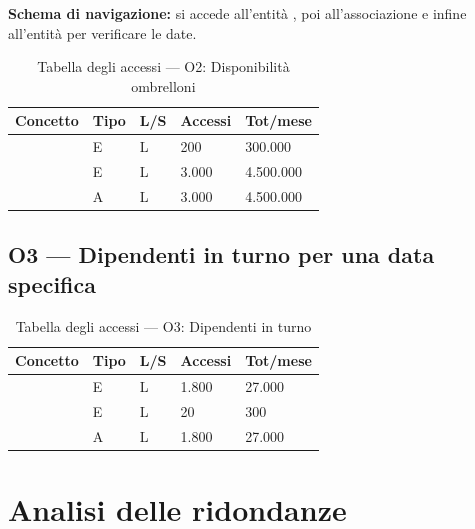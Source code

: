 \textbf{Schema di navigazione:} si accede all'entit\`{a} ,
poi all'associazione  e infine all'entit\`{a}
 per verificare le date.

\begin{table}[H]
  \centering
  \caption{Tabella degli accessi --- O2: Disponibilit\`{a} ombrelloni}
  \label{tab:accessi-o2}
  \begin{tabularx}{\textwidth}{L{4cm} C{2cm} C{2cm} C{2cm} C{2cm}}
    \toprule
    \textbf{Concetto} & \textbf{Tipo} & \textbf{L/S} & \textbf{Accessi} & \textbf{Tot/mese} \\
    \midrule
       & E & L & 200    & 300.000 \\
     & E & L & 3.000  & 4.500.000 \\
    & A & L & 3.000  & 4.500.000 \\
    \bottomrule
  \end{tabularx}
\end{table}

\subsection{O3 --- Dipendenti in turno per una data specifica}

\begin{table}[H]
  \centering
  \caption{Tabella degli accessi --- O3: Dipendenti in turno}
  \label{tab:accessi-o3}
  \begin{tabularx}{\textwidth}{L{4cm} C{2cm} C{2cm} C{2cm} C{2cm}}
    \toprule
    \textbf{Concetto} & \textbf{Tipo} & \textbf{L/S} & \textbf{Accessi} & \textbf{Tot/mese} \\
    \midrule
          & E & L & 1.800  & 27.000 \\
     & E & L & 20     & 300 \\
    & A & L & 1.800  & 27.000 \\
    \bottomrule
  \end{tabularx}
\end{table}

\section{Analisi delle ridondanze}

